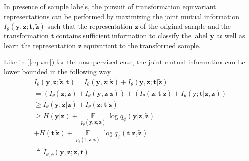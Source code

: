 \documentclass[10pt,journal,compsoc,twoside]{IEEEtran}
\begin{document}
In presence of sample labels, the pursuit of transformation equivariant representations can be performed by maximizing the joint mutual information $I_\theta(\mathbf y, \mathbf z; \mathbf t, \mathbf {\tilde z})$ such that the representation $\mathbf z$ of the original sample and the transformation $\mathbf t$  contains sufficient information to classify the label $\mathbf y$ as well as learn the representation $\mathbf z$ equivariant to the transformed sample.


Like in (\ref{eq:var}) for the unsupervised case, the joint mutual information can be lower bounded in the following way,
\[
\begin{aligned}
&I_\theta(\mathbf y,\mathbf z;\mathbf{\tilde z},\mathbf t) = I_\theta(\mathbf y,\mathbf z;\mathbf{\tilde z}) + I_\theta(\mathbf y,\mathbf z; \mathbf t|\mathbf{\tilde z})\\
&=(I_\theta(\mathbf z;\mathbf{\tilde z}) + I_\theta(\mathbf y,\mathbf{\tilde z} | \mathbf z))+ (I_\theta(\mathbf z;\mathbf t|\mathbf{\tilde z}) + I_\theta(\mathbf y;\mathbf t|\mathbf z,\mathbf{\tilde z}))\\
&\geq I_\theta(\mathbf y,\mathbf{\tilde z} | \mathbf z)+I_\theta(\mathbf z;\mathbf t|\mathbf{\tilde z})\\
&\geq H(\mathbf y|\mathbf z) + \mathop\mathbb E\limits_{p_\theta(\mathbf y,\mathbf z,\mathbf {\tilde z})} \log q_\phi(\mathbf y|\mathbf z,\mathbf {\tilde z})\\
&+H(\mathbf t|\mathbf {\tilde z}) + \mathop\mathbb E\limits_{p_\theta(\mathbf t,\mathbf z,\mathbf {\tilde z})} \log q_\phi(\mathbf t|\mathbf z,\mathbf {\tilde z})\\
&\triangleq \tilde I_{\theta,\phi}(\mathbf y,\mathbf z;\mathbf{\tilde z},\mathbf t)
\end{aligned}
\]
\end{document}
